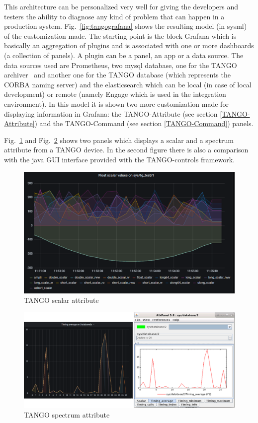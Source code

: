 \documentclass[]{spie}  %
\begin{document}
This architecture can be personalized very well for giving the developers and testers the ability to diagnose any kind of problem that can happen in a production system. Fig.~\ref{fig:tangografana} shows the resulting model (in sysml) of the customization made. The starting point is the block Grafana which is basically an aggregation of plugins and is associated with one or more dashboards (a collection of panels). A plugin can be a panel, an app or a data source. The data sources used are Prometheus, two mysql database, one for the TANGO archiver~\cite{tangoarchiver} and another one for the TANGO database (which represents the CORBA naming server) and the elasticsearch which can be local (in case of local development) or remote (namely Engage which is used in the integration environment). 
In this model it is shown two more customization made for displaying information in Grafana: the TANGO-Attribute (see section \ref{TANGO-Attribute}) and the TANGO-Command (see section \ref{TANGO-Command}) panels. 

Fig.~\ref{fig:scalar} and Fig.~\ref{fig:spectrum} shows two panels which displays a scalar and a spectrum attribute from a TANGO device. In the second figure there is also a comparison with the java GUI interface provided with the TANGO-controls framework. 

\begin{figure}[!htb]
   \centering
   \includegraphics*[width=0.6\columnwidth]{scalar}
       \caption{TANGO scalar attribute}
   \label{fig:scalar}
\end{figure}

\begin{figure}[!htb]
   \centering
   \includegraphics*[width=0.6\columnwidth]{spectrum}
       \caption{TANGO spectrum attribute}
   \label{fig:spectrum}
\end{figure}
\end{document}
